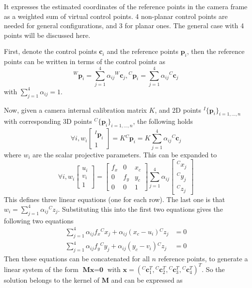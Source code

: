 \documentclass[12pt,a4paper]{article}
\begin{document}
    It expresses the estimated coordinates of the reference points in the camera frame as a weighted sum of virtual control points. 4 non-planar control points are needed for general configurations, and 3 for planar ones. The general case with 4 points will be discussed here.
     
    First, denote the control points $\textbf{c}_i$ and the reference points $\textbf{p}_i$, then the reference points can be written in terms of the control points as 
    \[
    {}^W\textbf{p}_i = \sum^4_{j=1}\alpha_{ij}{}^W\textbf{c}_j, {}^C\textbf{p}_i = \sum^4_{j=1}\alpha_{ij}{}^C\textbf{c}_j
    \]
    with $\sum^4_{j=1}\alpha_{ij}=1$.
     
    Now, given a camera internal calibration matrix $K$, and 2D points ${}^I\{\textbf{p}_i\}_{i=1,...,n}$ with corresponding 3D points ${}^C\{\textbf{p}_i\}_{i=1,...,n}$, the following holds \cite{lepetit2009epnp}
    \[
    \forall i, w_i \begin{bmatrix} {}^I\textbf{p}_i \\ 1 \end{bmatrix} = K{}^C\textbf{p}_i = K\sum^4_{j=1} \alpha_{ij}{}^C\textbf{c}_j
    \]
    where $w_i$ are the scalar projective parameters. This can be expanded to
    \[
    \forall i, w_i \begin{bmatrix} u_i \\ v_i \\ 1 \end{bmatrix} = \begin{bmatrix} f_x & 0 & x_c \\ 0 & f_y & y_c \\ 0 & 0 & 1 \end{bmatrix} \sum^4_{j=1} \alpha_{ij} \begin{bmatrix} {}^Cx_j \\ {}^Cy_j \\ {}^Cz_j \end{bmatrix}
    \]
    This defines three linear equations (one for each row). The last one is that $w_i = \sum^4_{j=1} \alpha_{ij}{}^Cz_j$. Substituting this into the first two equations gives the following two equations \cite{lepetit2009epnp}
    \begin{align*}
    \sum^4_{j=1}\alpha_{ij}f_x{}^Cx_j + \alpha_{ij}(x_c-u_i){}^Cz_j &= 0 \\
    \sum^4_{j=1}\alpha_{ij}f_y{}^Cy_j + \alpha_{ij}(y_c-v_i){}^Cz_j &= 0 
    \end{align*}
    Then these equations can be concatenated for all $n$ reference points, to generate a linear system of the form $\textbf{Mx}=\textbf{0}$ with $\textbf{x}=({}^C\textbf{c}_1^T, {}^C\textbf{c}_2^T, {}^C\textbf{c}_3^T, {}^C\textbf{c}_4^T)^T$. So the solution belongs to the kernel of $\textbf{M}$ and can be expressed as \cite{lepetit2009epnp}
\end{document}
